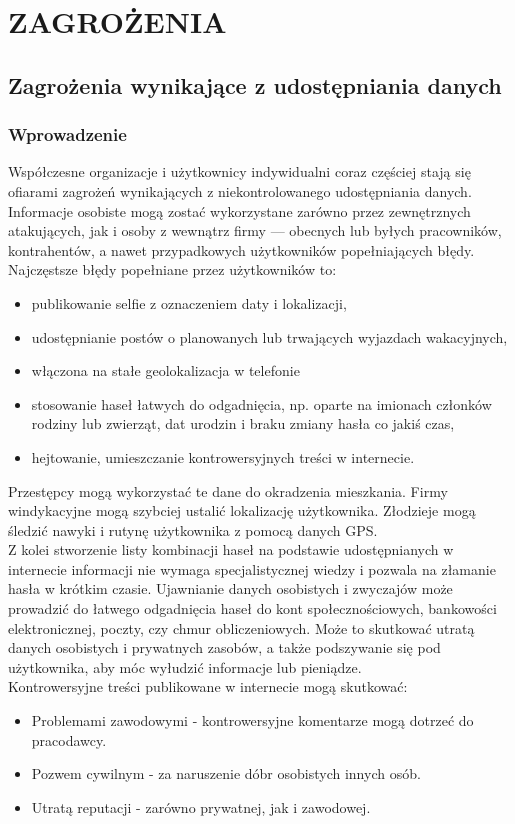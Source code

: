 \chapter{ZAGROŻENIA}
\section{Zagrożenia wynikające z udostępniania danych}

\subsection{Wprowadzenie}

Współczesne organizacje i użytkownicy indywidualni coraz częściej stają się ofiarami zagrożeń wynikających z niekontrolowanego udostępniania danych. Informacje osobiste mogą zostać wykorzystane zarówno przez zewnętrznych atakujących, jak i osoby z wewnątrz firmy — obecnych lub byłych pracowników, kontrahentów, a nawet przypadkowych użytkowników popełniających błędy.
\\
Najczęstsze błędy popełniane przez użytkowników to:
\begin{itemize}
\item publikowanie selfie z oznaczeniem daty i lokalizacji,
\item udostępnianie postów o planowanych lub trwających wyjazdach wakacyjnych,
\item włączona na stałe geolokalizacja w telefonie
\item stosowanie haseł łatwych do odgadnięcia, np. oparte na imionach członków rodziny lub zwierząt, dat urodzin i braku zmiany hasła co jakiś czas,
\item hejtowanie, umieszczanie kontrowersyjnych treści w internecie.
\end{itemize}

Przestępcy mogą wykorzystać te dane do okradzenia mieszkania.
Firmy windykacyjne mogą szybciej ustalić lokalizację użytkownika.
Złodzieje mogą śledzić nawyki i rutynę użytkownika z pomocą danych GPS.\\
Z kolei stworzenie listy kombinacji haseł na podstawie udostępnianych w internecie informacji nie wymaga specjalistycznej wiedzy i pozwala na złamanie hasła w krótkim czasie. Ujawnianie danych osobistych i zwyczajów może prowadzić do łatwego odgadnięcia haseł do kont społecznościowych, bankowości elektronicznej, poczty, czy chmur obliczeniowych. Może to skutkować utratą danych osobistych i prywatnych zasobów, a także podszywanie się pod użytkownika, aby móc wyłudzić informacje lub pieniądze.\\
Kontrowersyjne treści publikowane w internecie mogą skutkować:
\begin{itemize}
  \item Problemami zawodowymi - kontrowersyjne komentarze mogą dotrzeć do pracodawcy.
  \item Pozwem cywilnym - za naruszenie dóbr osobistych innych osób.
  \item Utratą reputacji - zarówno prywatnej, jak i zawodowej.
\end{itemize}

